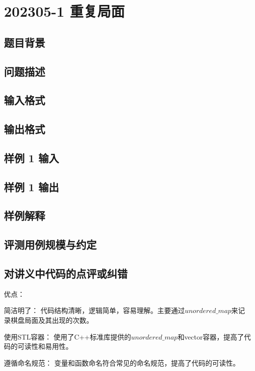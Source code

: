 \section{202305-1 重复局面}

\subsection{题目背景}

\subsection{问题描述}

\subsection{输入格式}

\subsection{输出格式}

\subsection{样例 1 输入}

\subsection{样例 1 输出}

\subsection{样例解释}

\subsection{评测用例规模与约定}

\subsection{对讲义中代码的点评或纠错}
 
优点：

简洁明了： 代码结构清晰，逻辑简单，容易理解。主要通过$unordered\_map$来记录棋盘局面及其出现的次数。

使用STL容器： 使用了C++标准库提供的$unordered\_map$和vector容器，提高了代码的可读性和易用性。

遵循命名规范： 变量和函数命名符合常见的命名规范，提高了代码的可读性。

